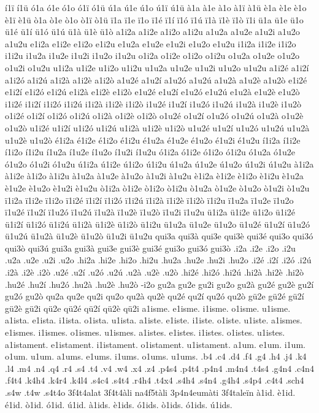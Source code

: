 {í1ï í1ü
ó1a ó1e ó1o
ó1ï ó1ü
ú1a ú1e ú1o
ú1ï ú1ü
à1a à1e à1o
à1ï à1ü
è1a è1e è1o
è1ï è1ü
ò1a ò1e ò1o
ò1ï ò1ü
ï1a ï1e ï1o ï1é ï1í
ï1ó ï1ú ï1à
ï1è ï1ò ï1i
ü1a ü1e ü1o ü1é ü1í
ü1ó ü1ú ü1à
ü1è ü1ò
a1i2a a1i2e a1i2o a1i2u
a1u2a a1u2e a1u2i a1u2o a1u2u
e1i2a e1i2e e1i2o e1i2u
e1u2a e1u2e e1u2i e1u2o e1u2u
i1i2a i1i2e i1i2o i1i2u
i1u2a i1u2e i1u2i i1u2o i1u2u
o1i2a o1i2e o1i2o o1i2u
o1u2a o1u2e o1u2o o1u2i o1u2u
u1i2a u1i2e u1i2o u1i2u
u1u2a u1u2e u1u2i u1u2o u1u2u
a1i2é a1i2í a1i2ó a1i2ú a1i2à
a1i2è a1i2ò
a1u2é a1u2í a1u2ó a1u2ú a1u2à
a1u2è a1u2ò
e1i2é e1i2í e1i2ó e1i2ú e1i2à
e1i2è e1i2ò
e1u2é e1u2í e1u2ó e1u2ú e1u2à
e1u2è e1u2ò
i1i2é i1i2í i1i2ó i1i2ú i1i2à
i1i2è i1i2ò
i1u2é i1u2í i1u2ó i1u2ú i1u2à
i1u2è i1u2ò
o1i2é o1i2í o1i2ó o1i2ú o1i2à
o1i2è o1i2ò
o1u2é o1u2í o1u2ó o1u2ú o1u2à
o1u2è o1u2ò
u1i2é u1i2í u1i2ó u1i2ú u1i2à
u1i2è u1i2ò
u1u2é u1u2í u1u2ó u1u2ú u1u2à
u1u2è u1u2ò
é1i2a é1i2e é1i2o é1i2u
é1u2a é1u2e é1u2o é1u2i é1u2u
í1i2a í1i2e í1i2o í1i2u
í1u2a í1u2e í1u2o í1u2i í1u2u
ó1i2a ó1i2e ó1i2o ó1i2u
ó1u2a ó1u2e ó1u2o ó1u2i ó1u2u
ú1i2a ú1i2e ú1i2o ú1i2u
ú1u2a ú1u2e ú1u2o ú1u2i ú1u2u
à1i2a à1i2e à1i2o à1i2u
à1u2a à1u2e à1u2o à1u2i à1u2u
è1i2a è1i2e è1i2o è1i2u
è1u2a è1u2e è1u2o è1u2i è1u2u
ò1i2a ò1i2e ò1i2o ò1i2u
ò1u2a ò1u2e ò1u2o ò1u2i ò1u2u
ï1i2a ï1i2e ï1i2o ï1i2é ï1i2í
ï1i2ó
ï1i2ú ï1i2à
ï1i2è ï1i2ò ï1i2u
ï1u2a ï1u2e ï1u2o ï1u2é ï1u2í
ï1u2ó
ï1u2ú ï1u2à
ï1u2è ï1u2ò ï1u2i ï1u2u
ü1i2a ü1i2e ü1i2o ü1i2é ü1i2í
ü1i2ó
ü1i2ú ü1i2à
ü1i2è ü1i2ò ü1i2u
ü1u2a ü1u2e ü1u2o ü1u2é ü1u2í
ü1u2ó
ü1u2ú ü1u2à
ü1u2è ü1u2ò ü1u2i ü1u2u
qui3a qui3à qui3e qui3è qui3é qui3o qui3ó qui3ò qui3ú
gui3a gui3à gui3e gui3è gui3é gui3o gui3ó gui3ò
.i2a .i2e .i2o .i2u .u2a .u2e .u2i .u2o
.hi2a .hi2e .hi2o .hi2u .hu2a .hu2e .hu2i .hu2o
.i2é .i2í .i2ó .i2ú .i2à
.i2è .i2ò
.u2é .u2í .u2ó .u2ú .u2à
.u2è .u2ò
.hi2é .hi2ó .hi2ú .hi2à .hi2è
.hi2ò
.hu2é .hu2í .hu2ó .hu2à .hu2è
.hu2ò
-i2o
gu2a gu2e gu2i gu2o 
gu2à gu2é gu2è gu2í gu2ó gu2ò 
qu2a qu2e qu2i qu2o
qu2à qu2è qu2é qu2í qu2ó qu2ò
gü2e gü2é gü2í gü2è gü2i
qü2e qü2é qü2í qü2è qü2i
a1isme. e1isme. i1isme. o1isme. u1isme.
a1ista. e1ista. i1ista. o1ista. u1ista.
a1iste. e1iste. i1iste. o1iste. u1iste.
a1ismes. e1ismes. i1ismes. o1ismes. u1ismes.
a1istes. e1istes. i1istes. o1istes. u1istes.
a1istament. e1istament. i1istament. o1istament. u1istament.
a1um. e1um. i1um. o1um. u1um.
a1ums. e1ums. i1ums. o1ums. u1ums.
.b4 .c4 .d4 .f4 .g4 .h4 .j4 .k4 .l4 .m4 .n4 .q4 .r4 .s4 .t4 .v4 .w4 .x4 .z4
.p4s4 .p4t4 .p4n4 .m4n4 .t4s4 .g4n4 .c4n4 .f4t4 .k4h4 .k4r4 .k4l4
.s4c4 .s4t4 .r4h4 .t4x4 .s4h4 .s4n4 .g4h4 .s4p4 .c4t4
.sch4 .s4w .t4w .s4t4o
3f4t4alat
3f4t4àli
na4f5tàli
3p4n4eumàti
3f4taleïn
à1id.
è1id.
é1id.
ò1id.
ó1id.
ú1id.
à1ids.
è1ids.
ó1ids.
ò1ids.
ó1ids.
ú1ids.

}
